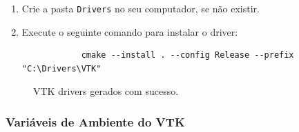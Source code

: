 \documentclass[a4paper,11pt]{article}
\begin{document}
\begin{enumerate}
	\item Crie a pasta {\tt Drivers} no seu computador, se não existir.
	\item Execute o seguinte comando para instalar o driver:
	
	\begin{mdframed}
		\begin{verbatim}
			cmake --install . --config Release --prefix "C:\Drivers\VTK"
		\end{verbatim}
	\end{mdframed}
\end{enumerate}

\begin{figure}[H]
	\centering
	\caption{VTK drivers gerados com sucesso.}
	\label{fig:vtk_drivers}
\end{figure}

\subsubsection{Variáveis de Ambiente do VTK}
\end{document}
